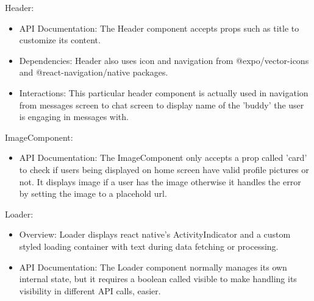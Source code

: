 \begin{compactenum}
\begin{itemize}
    \end{itemize}
    \item Header:
    \begin{itemize}
        \item API Documentation: The Header component accepts props such as title to customize its content.
        \item Dependencies: Header also uses icon and navigation from @expo/vector-icons and @react-navigation/native packages.
        \item Interactions: This particular header component is actually used in navigation from messages screen to chat screen to display name of the 'buddy' the user is engaging in messages with.
    \end{itemize}
    \item ImageComponent:
    \begin{itemize}
        \item API Documentation: The ImageComponent only accepts a prop called 'card' to check if users being displayed on home screen have valid profile pictures or not. It displays image if a user has the image otherwise it handles the error by setting the image to a placehold url.
    \end{itemize}
    \item Loader:
    \begin{itemize}
        \item Overview: Loader displays react native's ActivityIndicator and a custom styled loading container with text during data fetching or processing.
        \item API Documentation: The Loader component normally manages its own internal state, but it requires a boolean called visible to make handling its visibility in different API calls, easier.
    \end{itemize}
\end{compactenum}

